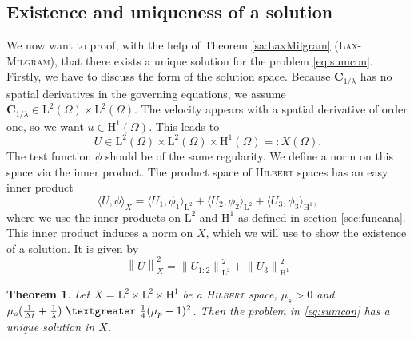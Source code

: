 \documentclass[12pt,a4paper,twoside, open=right]{scrreprt}
\theoremstyle{definition}
\theoremstyle{plain}
\newtheorem{sa}[auf]{Theorem}
\newcommand{\g}{~\textgreater ~}
\newcommand{\norm}[1]{\left\lVert#1\right\rVert}
\newcommand{\bfC}{\bm{C}}
\begin{document}
\subsection{Existence and uniqueness of a solution}
\label{sec:existence}
We now want to proof, with the help of Theorem \ref{sa:LaxMilgram} (\textsc{Lax-Milgram}), that there exists a unique solution for the problem \eqref{eq:sumcon}. Firstly, we have to discuss the form of the solution space. Because $\bfC_{1/\lambda}$ has no spatial derivatives in the governing equations, we assume $\bfC_{1/\lambda}\in \mathrm{L}^2(\Omega)\times \mathrm{L}^2(\Omega)$. The velocity appears with a spatial derivative of order one, so we want $u\in \mathrm{H}^1(\Omega)$. This leads to 
\begin{equation}
    U\in \mathrm{L}^2(\Omega)\times \mathrm{L}^2(\Omega)\times \mathrm{H}^1(\Omega)=:X(\Omega).
\end{equation} The test function $\phi$ should be of the same regularity. We define a norm on this space via the inner product. The product space of \textsc{Hilbert} spaces has an easy inner product
\begin{equation}
    \langle U,\phi\rangle_X = \langle U_1,\phi_1\rangle_{\mathrm{L}^2} +  \langle U_2,\phi_2\rangle_{\mathrm{L}^2} +\langle U_3,\phi_3\rangle_{\mathrm{H}^1},
\end{equation}
where we use the inner products on $\mathrm{L}^2$ and $\mathrm{H}^1$ as defined in section \ref{sec:funcana}. This inner product induces a norm on $X$, which we will use to show the existence of a solution. It is given by
\begin{equation}
    \norm{U}_X^2=\norm{U_{1:2}}_{\mathrm{L}^2}^2+\norm{U_3}_{\mathrm{H}^1}^2
\end{equation}
\begin{sa}
    Let $X=\mathrm{L}^2\times\mathrm{L}^2\times \mathrm{H}^1$ be a \textsc{Hilbert} space, $\mu_s> 0$ and $\mu_s(\frac{1}{\Delta t}+\frac{1}{\lambda})\g \frac{1}{4}(\mu_p-1)^2$.
    Then the problem in \eqref{eq:sumcon} has a unique solution  in $X$.
\end{sa}
\end{document}
